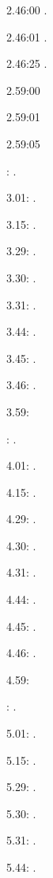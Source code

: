 \documentclass[italian]{article}
\begin{document}
2.46:00   .

2.46:01   .

2.46:25   .

2.59:00   

2.59:01   

2.59:05   

:  .

3.01:   . 

3.15:   . 

3.29:   . 

3.30:   .

3.31:   .

3.44:   .

3.45:   .

3.46:   .

3.59:   

:  .

4.01:   . 

4.15:   . 

4.29:   . 

4.30:   .

4.31:   .

4.44:   .

4.45:   .

4.46:   .

4.59:   

:  .

5.01:   . 

5.15:   . 

5.29:   . 

5.30:   .

5.31:   .

5.44:   .
\end{document}

